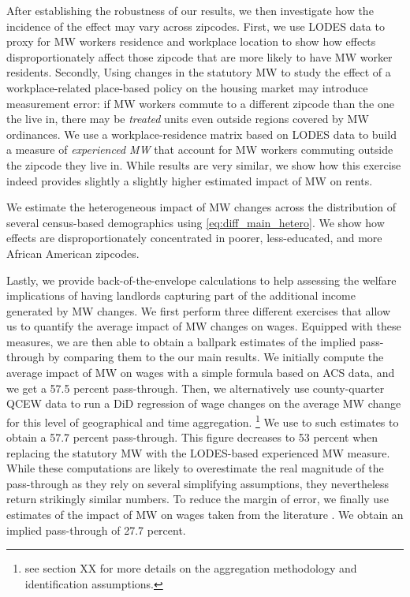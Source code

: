 After establishing the robustness of our results, we then investigate how the incidence of the 
effect may vary across zipcodes. First, we use LODES data to proxy for MW workers residence and workplace 
location to show how effects disproportionately affect those zipcode that are more likely to have 
MW worker residents. Secondly, Using changes in the statutory MW to study the effect of a workplace-related 
place-based policy on the housing market may introduce measurement error: if MW workers 
commute to a different zipcode than the one the live in, there may be \textit{treated} units even 
outside regions covered by MW ordinances.  We use a workplace-residence matrix based on LODES 
data to build a measure of \textit{experienced MW} that account for MW workers commuting outside the zipcode
they live in. While results are very similar, we show how this exercise indeed provides slightly a slightly higher 
estimated impact of MW on rents. 
  
We estimate the heterogeneous impact of MW changes across the 
distribution of several census-based demographics using \autoref{eq:diff_main_hetero}. We show how 
effects are disproportionately concentrated in poorer, less-educated, and more 
African American zipcodes. 

Lastly, we provide back-of-the-envelope calculations to help assessing the welfare implications of 
having landlords capturing part of the additional income generated by MW changes. We first perform three
different exercises that allow us to quantify the average impact of MW changes on wages. Equipped with these 
measures, we are then able to obtain a ballpark estimates of the implied pass-through by comparing them to 
the our main results. We initially compute the average impact of MW on wages with a simple formula based on 
ACS data, and we get a 57.5 percent pass-through. Then, we alternatively use county-quarter QCEW data to run a 
DiD regression of wage changes on the average MW change for this level of geographical and time aggregation.
\footnote{see section XX for more details on the aggregation methodology and identification assumptions.} 
We use to such estimates to obtain a 57.7 percent pass-through. This figure decreases to 53
percent when replacing the statutory MW with the LODES-based experienced MW measure. While these computations are
likely to overestimate the real magnitude of the pass-through as they rely on several simplifying assumptions, they 
nevertheless return strikingly similar numbers. To reduce the margin of error,  we finally use estimates of the impact of MW 
on wages taken from the literature \parencite{CegnizEtAl2019}. We obtain an implied pass-through of 27.7 percent. 


